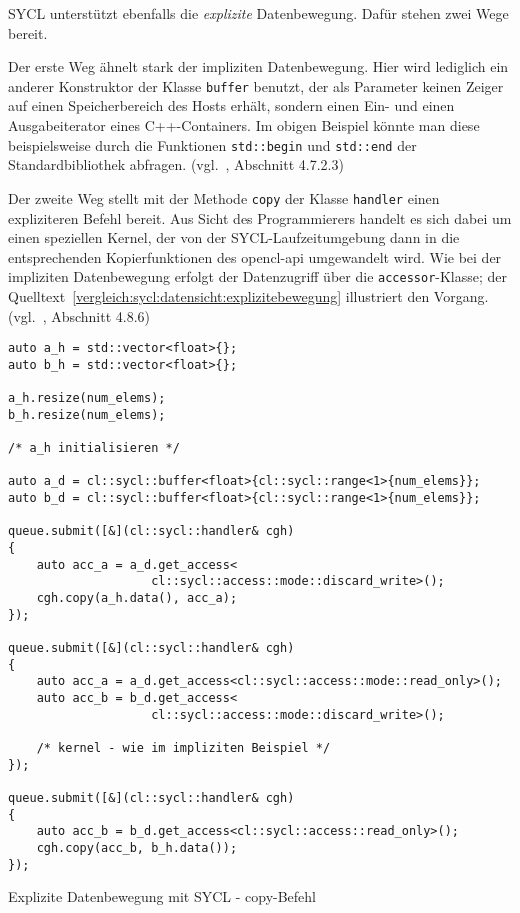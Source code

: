 SYCL unterstützt ebenfalls die \textit{explizite} Datenbewegung. Dafür stehen
zwei Wege bereit.

Der erste Weg ähnelt stark der impliziten Datenbewegung. Hier wird lediglich
ein anderer Konstruktor der Klasse \texttt{buffer} benutzt, der als Parameter
keinen Zeiger auf einen Speicherbereich des Hosts erhält, sondern
einen Ein- und einen Ausgabeiterator eines C++-Containers. Im obigen Beispiel
könnte man diese beispielsweise durch die Funktionen \texttt{std::begin} und
\texttt{std::end} der Standardbibliothek abfragen.
(vgl.~\cite{syclspec}, Abschnitt 4.7.2.3)

Der zweite Weg stellt mit der Methode \texttt{copy} der Klasse \texttt{handler}
einen expliziteren Befehl bereit. Aus Sicht des Programmierers handelt es sich
dabei um einen speziellen Kernel, der von der SYCL-Laufzeitumgebung dann in die
entsprechenden Kopierfunktionen des \gls{opencl}-\gls{api} umgewandelt wird. Wie
bei der impliziten Datenbewegung erfolgt der Datenzugriff über die
\texttt{accessor}-Klasse; der
Quelltext~\ref{vergleich:sycl:datensicht:explizitebewegung} illustriert den
Vorgang. (vgl.~\cite{syclspec}, Abschnitt 4.8.6)

\begin{code}
    \begin{verbatim}
auto a_h = std::vector<float>{};
auto b_h = std::vector<float>{};

a_h.resize(num_elems);
b_h.resize(num_elems);

/* a_h initialisieren */

auto a_d = cl::sycl::buffer<float>{cl::sycl::range<1>{num_elems}};
auto b_d = cl::sycl::buffer<float>{cl::sycl::range<1>{num_elems}};

queue.submit([&](cl::sycl::handler& cgh)
{
    auto acc_a = a_d.get_access<
                    cl::sycl::access::mode::discard_write>();
    cgh.copy(a_h.data(), acc_a);
});

queue.submit([&](cl::sycl::handler& cgh)
{
    auto acc_a = a_d.get_access<cl::sycl::access::mode::read_only>();
    auto acc_b = b_d.get_access<
                    cl::sycl::access::mode::discard_write>();

    /* kernel - wie im impliziten Beispiel */
});

queue.submit([&](cl::sycl::handler& cgh)
{
    auto acc_b = b_d.get_access<cl::sycl::access::read_only>();
    cgh.copy(acc_b, b_h.data());
});
    \end{verbatim}
    \caption{Explizite Datenbewegung mit SYCL - copy-Befehl}
    \label{vergleich:sycl:datensicht:explizitebewegung}
\end{code}

